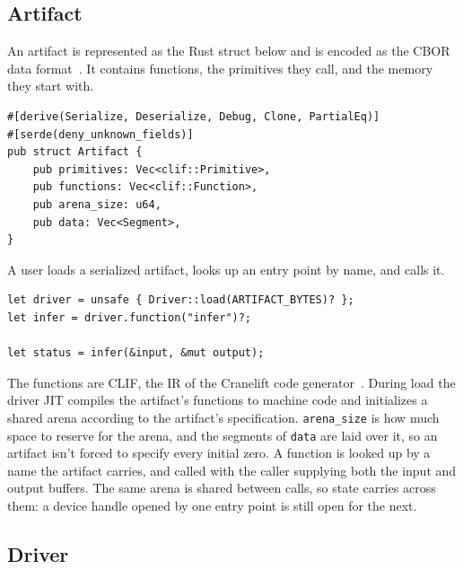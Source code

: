 \documentclass[11pt]{article}
\newenvironment{codeblock}
  {\par\noindent\begin{minipage}{\linewidth}}
  {\end{minipage}\par\noindent}
\begin{document}
\subsection{Artifact}
\label{sec:contents}

An artifact is represented as the Rust struct below and is encoded as the CBOR
data format~\cite{cbor}. It contains functions, the primitives they call, and
the memory they start with.

\begin{codeblock}
\begin{lstlisting}[style=code,morekeywords={pub,struct,derive,serde}]
#[derive(Serialize, Deserialize, Debug, Clone, PartialEq)]
#[serde(deny_unknown_fields)]
pub struct Artifact {
    pub primitives: Vec<clif::Primitive>,
    pub functions: Vec<clif::Function>,
    pub arena_size: u64,
    pub data: Vec<Segment>,
}
\end{lstlisting}
\end{codeblock}

A user loads a serialized artifact, looks up an entry point by name, and calls
it.

\begin{codeblock}
\begin{lstlisting}[style=code,morekeywords={let,mut,unsafe}]
let driver = unsafe { Driver::load(ARTIFACT_BYTES)? };
let infer = driver.function("infer")?;

let status = infer(&input, &mut output);
\end{lstlisting}
\end{codeblock}

The functions are CLIF, the IR of the Cranelift code generator~\cite{cranelift}.
During load the driver JIT compiles the artifact's functions to machine code and
initializes a shared arena according to the artifact's specification.
\texttt{arena\_size} is how much space to reserve for the arena, and the
segments of \texttt{data} are laid over it, so an artifact isn't forced to
specify every initial zero. A function is looked up by a name the artifact
carries, and called with the caller supplying both the input and output
buffers. The same arena is shared between calls, so state carries across
them: a device handle opened by one entry point is still open for the next.

\subsection{Driver}
\label{sec:running}
\end{document}
